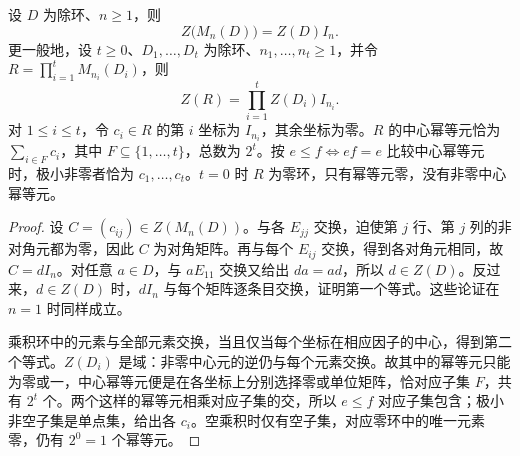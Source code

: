 \begin{proposition}\label{b2:prop:matrix-centers-central-idempotents}
	设 \(D\) 为除环、\(n\ge1\)，则
	\[
		Z\bigl(M_n(D)\bigr)=Z(D)I_n.
	\]
	更一般地，设 \(t\ge0\)、\(D_1,\ldots,D_t\) 为除环、\(n_1,\ldots,n_t\ge1\)，并令 \(R=\prod_{i=1}^tM_{n_i}(D_i)\)，则
	\[
		Z(R)=\prod_{i=1}^t Z(D_i)I_{n_i}.
	\]
	对 \(1\le i\le t\)，令 \(c_i\in R\) 的第 \(i\) 坐标为 \(I_{n_i}\)，其余坐标为零。\(R\) 的中心幂等元恰为 \(\sum_{i\in F}c_i\)，其中 \(F\subseteq\{1,\ldots,t\}\)，总数为 \(2^t\)。按 \(e\le f\iff ef=e\) 比较中心幂等元时，极小非零者恰为 \(c_1,\ldots,c_t\)。\(t=0\) 时 \(R\) 为零环，只有幂等元零，没有非零中心幂等元。
\end{proposition}
\begin{proof}
	设 \(C=(c_{ij})\in Z(M_n(D))\)。与各 \(E_{jj}\) 交换，迫使第 \(j\) 行、第 \(j\) 列的非对角元都为零，因此 \(C\) 为对角矩阵。再与每个 \(E_{ij}\) 交换，得到各对角元相同，故 \(C=dI_n\)。对任意 \(a\in D\)，与 \(aE_{11}\) 交换又给出 \(da=ad\)，所以 \(d\in Z(D)\)。反过来，\(d\in Z(D)\) 时，\(dI_n\) 与每个矩阵逐条目交换，证明第一个等式。这些论证在 \(n=1\) 时同样成立。

	乘积环中的元素与全部元素交换，当且仅当每个坐标在相应因子的中心，得到第二个等式。\(Z(D_i)\) 是域：非零中心元的逆仍与每个元素交换。故其中的幂等元只能为零或一，中心幂等元便是在各坐标上分别选择零或单位矩阵，恰对应子集 \(F\)，共有 \(2^t\) 个。两个这样的幂等元相乘对应子集的交，所以 \(e\le f\) 对应子集包含；极小非空子集是单点集，给出各 \(c_i\)。空乘积时仅有空子集，对应零环中的唯一元素零，仍有 \(2^0=1\) 个幂等元。
\end{proof}

